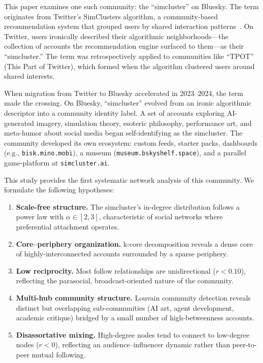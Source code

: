 \documentclass[11pt,a4paper]{article}
\begin{document}
This paper examines one such community: the ``simcluster'' on Bluesky. The term originates from Twitter's SimClusters algorithm, a community-based recommendation system that grouped users by shared interaction patterns~\cite{simclusters-kdd2020}. On Twitter, users ironically described their algorithmic neighborhoods---the collection of accounts the recommendation engine surfaced to them---as their ``simcluster.'' The term was retrospectively applied to communities like ``TPOT'' (This Part of Twitter), which formed when the algorithm clustered users around shared interests.

When migration from Twitter to Bluesky accelerated in 2023--2024, the term made the crossing. On Bluesky, ``simcluster'' evolved from an ironic algorithmic descriptor into a community identity label. A set of accounts exploring AI-generated imagery, simulation theory, esoteric philosophy, performance art, and meta-humor about social media began self-identifying as the simcluster. The community developed its own ecosystem: custom feeds, starter packs, dashboards (e.g., \texttt{bisk.mino.mobi}), a museum (\texttt{museum.bskyshelf.space}), and a parallel game-platform at \texttt{simcluster.ai}.

This study provides the first systematic network analysis of this community. We formulate the following hypotheses:

\begin{enumerate}[label=\textbf{H\arabic*:}, leftmargin=*]
    \item \textbf{Scale-free structure.} The simcluster's in-degree distribution follows a power law with $\alpha \in [2, 3]$, characteristic of social networks where preferential attachment operates.
    \item \textbf{Core--periphery organization.} k-core decomposition reveals a dense core of highly-interconnected accounts surrounded by a sparse periphery.
    \item \textbf{Low reciprocity.} Most follow relationships are unidirectional ($r < 0.10$), reflecting the parasocial, broadcast-oriented nature of the community.
    \item \textbf{Multi-hub community structure.} Louvain community detection reveals distinct but overlapping sub-communities (AI art, agent development, academic critique) bridged by a small number of high-betweenness accounts.
    \item \textbf{Disassortative mixing.} High-degree nodes tend to connect to low-degree nodes ($r < 0$), reflecting an audience--influencer dynamic rather than peer-to-peer mutual following.
\end{enumerate}
\end{document}
